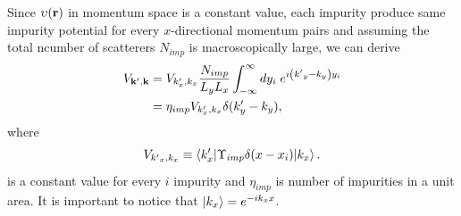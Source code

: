Since $\upsilon (\vb{r})$ in momentum space is a constant value, each impurity  produce same impurity potential for every $x$-directional momentum pairs and assuming the total ncumber of scatterers $N_{imp}$ is macroscopically large, we can derive
\begin{subequations} \label{eq_c25}
  \begin{align}
    V_{\vb{k'},\vb{k}}
    & =
    V_{k'_x,k_x}
    \frac{N_{imp}}{L_y L_x} \int_{-\infty}^{\infty} dy_i\;
    e^{i\qty({k'}_y - k_y)y_i} \label{eq_c25a} \\
    & =
    \eta_{imp} V_{k'_x,k_x} \delta(k'_y - k_y), \label{eq_c25b}
  \end{align}
\end{subequations}
where
\begin{equation} \label{eq_c26}
  V_{{k'}_x,k_x} \equiv
  \mel**{k'_x}{\Upsilon_{imp} \delta(x-x_i)}{k_x}.
\end{equation}
is a constant value for every $i$ impurity and $\eta_{imp}$ is number of impurities in a unit area. It is important to notice that $\ket{k_x} = e^{-ik_xx}$.

